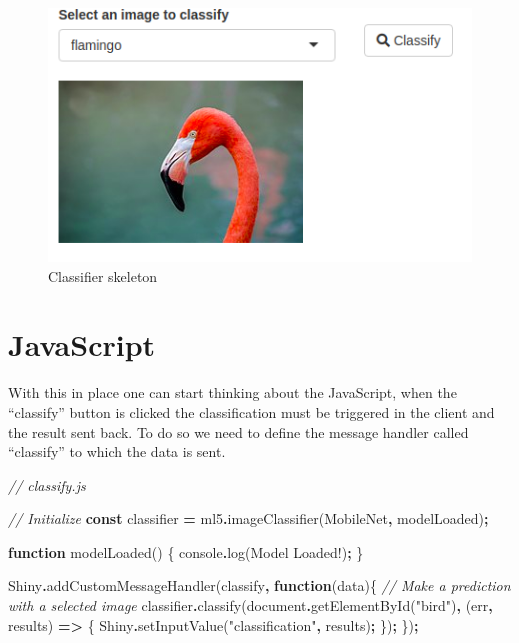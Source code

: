 \documentclass[
]{krantz}
\makeatletter
\newenvironment{Shaded}{\begin{snugshade}}{\end{snugshade}}
\newcommand{\BuiltInTok}[1]{#1}
\newcommand{\CommentTok}[1]{\textcolor[rgb]{0.37,0.37,0.37}{\textit{#1}}}
\newcommand{\FunctionTok}[1]{\textcolor[rgb]{0,0,0}{#1}}
\newcommand{\KeywordTok}[1]{\textcolor[rgb]{0.27,0.27,0.27}{\textbf{#1}}}
\newcommand{\NormalTok}[1]{#1}
\newcommand{\OperatorTok}[1]{\textcolor[rgb]{0.43,0.43,0.43}{\textbf{#1}}}
\newcommand{\StringTok}[1]{\textcolor[rgb]{0.5,0.5,0.5}{#1}}
\newenvironment{kframe}{%
\medskip{}
\setlength{\fboxsep}{.8em}
 \def\at@end@of@kframe{}%
 \ifinner\ifhmode%
  \def\at@end@of@kframe{\end{minipage}}%
  \begin{minipage}{\columnwidth}%
 \fi\fi%
 \def\FrameCommand##1{\hskip\@totalleftmargin \hskip-\fboxsep
 \colorbox{shadecolor}{##1}\hskip-\fboxsep
     \hskip-\linewidth \hskip-\@totalleftmargin \hskip\columnwidth}%
 \MakeFramed {\advance\hsize-\width
   \@totalleftmargin\z@ \linewidth\hsize
   \@setminipage}}%
 {\par\unskip\endMakeFramed%
 \at@end@of@kframe}
\renewenvironment{Shaded}{\begin{kframe}}{\end{kframe}}
\makeatother
\begin{document}
\begin{figure}
\centering
\includegraphics{images/ml5-init.png}
\caption{Classifier skeleton}
\end{figure}

\hypertarget{javascript-3}{%
\section*{JavaScript}\label{javascript-3}}


With this in place one can start thinking about the JavaScript, when the ``classify'' button is clicked the classification must be triggered in the client and the result sent back. To do so we need to define the message handler called ``classify'' to which the data is sent.

\begin{Shaded}
\begin{Highlighting}[]
\CommentTok{// classify.js}

\CommentTok{// Initialize }
\KeywordTok{const}\NormalTok{ classifier }\OperatorTok{=}\NormalTok{ ml5}\OperatorTok{.}\FunctionTok{imageClassifier}\NormalTok{(}\StringTok{\textquotesingle{}MobileNet\textquotesingle{}}\OperatorTok{,}\NormalTok{ modelLoaded)}\OperatorTok{;}

\KeywordTok{function} \FunctionTok{modelLoaded}\NormalTok{() \{}
  \BuiltInTok{console}\OperatorTok{.}\FunctionTok{log}\NormalTok{(}\StringTok{\textquotesingle{}Model Loaded!\textquotesingle{}}\NormalTok{)}\OperatorTok{;}
\NormalTok{\}}

\NormalTok{Shiny}\OperatorTok{.}\FunctionTok{addCustomMessageHandler}\NormalTok{(}\StringTok{\textquotesingle{}classify\textquotesingle{}}\OperatorTok{,} \KeywordTok{function}\NormalTok{(data)\{}
  \CommentTok{// Make a prediction with a selected image}
\NormalTok{  classifier}\OperatorTok{.}\FunctionTok{classify}\NormalTok{(}\BuiltInTok{document}\OperatorTok{.}\FunctionTok{getElementById}\NormalTok{(}\StringTok{"bird"}\NormalTok{)}\OperatorTok{,}\NormalTok{ (err}\OperatorTok{,}\NormalTok{ results) }\KeywordTok{=\textgreater{}}\NormalTok{ \{}
\NormalTok{    Shiny}\OperatorTok{.}\FunctionTok{setInputValue}\NormalTok{(}\StringTok{"classification"}\OperatorTok{,}\NormalTok{ results)}\OperatorTok{;}
\NormalTok{  \})}\OperatorTok{;}
\NormalTok{\})}\OperatorTok{;}
\end{Highlighting}
\end{Shaded}
\end{document}

